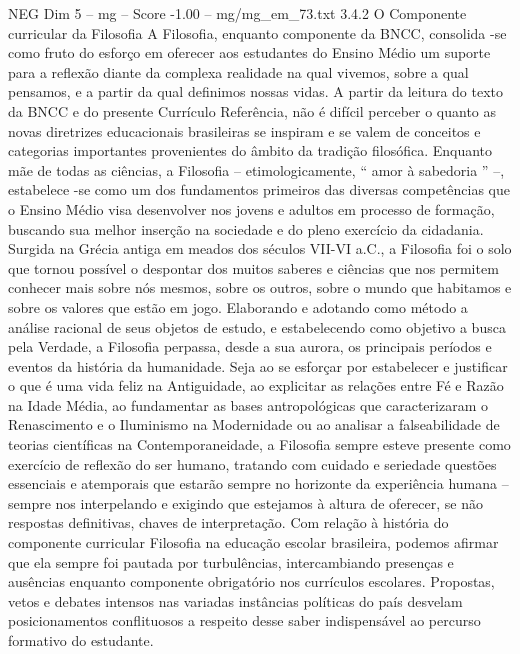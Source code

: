 \begin{textsample}{NEG Dim 5 – mg – Score -1.00 – mg/mg\_em\_73.txt}  \label{ex:f5_neg_103}
3.4.2 O Componente curricular da Filosofia A Filosofia, enquanto componente da BNCC, consolida -se como fruto do esforço em oferecer aos estudantes do Ensino Médio um suporte para a reflexão diante da complexa realidade na qual vivemos, sobre a qual pensamos, e a partir da qual definimos nossas vidas.
A partir da leitura do texto da BNCC e do presente Currículo Referência, não é difícil perceber o quanto as novas diretrizes educacionais brasileiras se inspiram e se valem de conceitos e categorias importantes provenientes do âmbito da tradição filosófica.
Enquanto mãe de todas as ciências, a Filosofia – etimologicamente, “ amor à sabedoria ” –, estabelece -se como um dos fundamentos primeiros das diversas competências que o Ensino Médio visa desenvolver nos jovens e adultos em processo de formação, buscando sua melhor inserção na sociedade e do pleno exercício da cidadania.
Surgida na Grécia antiga em meados dos séculos VII-VI a.C., a Filosofia foi o solo que tornou possível o despontar dos muitos saberes e ciências que nos permitem conhecer mais sobre nós mesmos, sobre os outros, sobre o mundo que habitamos e sobre os valores que estão em jogo.
Elaborando e adotando como método a análise racional de seus objetos de estudo, e estabelecendo como objetivo a busca pela Verdade, a Filosofia perpassa, desde a sua aurora, os principais períodos e eventos da história da humanidade.
Seja ao se esforçar por estabelecer e justificar o que é uma vida feliz na Antiguidade, ao explicitar as relações entre Fé e Razão na Idade Média, ao fundamentar as bases antropológicas que caracterizaram o Renascimento e o Iluminismo na Modernidade ou ao analisar a falseabilidade de teorias científicas na Contemporaneidade, a Filosofia sempre esteve presente como exercício de reflexão do ser humano, tratando com cuidado e seriedade questões essenciais e atemporais que estarão sempre no horizonte da experiência humana – sempre nos interpelando e exigindo que estejamos à altura de oferecer, se não respostas definitivas, chaves de interpretação.
Com relação à história do componente curricular Filosofia na educação escolar brasileira, podemos afirmar que ela sempre foi pautada por turbulências, intercambiando presenças e ausências enquanto componente obrigatório nos currículos escolares.
Propostas, vetos e debates intensos nas variadas instâncias políticas do país desvelam posicionamentos conflituosos a respeito desse saber indispensável ao percurso formativo do estudante.

\end{textsample}
